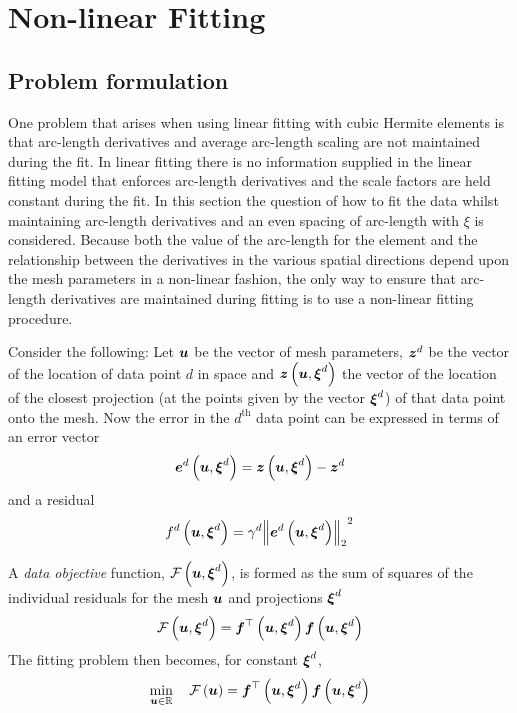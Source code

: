 \section{Non-linear Fitting}
\label{sec:nonlinearfitting} 

\subsection{Problem formulation}
\label{sec:problemformulation}

One problem that arises when using linear fitting with cubic Hermite elements is
that arc-length derivatives and average arc-length scaling are not maintained during
the fit. In linear fitting there is no information supplied in the linear
fitting model that enforces arc-length derivatives and the scale factors are held
constant during the fit. In this section the question of how to fit the data
whilst maintaining arc-length derivatives and an even spacing of arc-length with
$\xi$ is considered.  Because both the value of the arc-length for the element
and the relationship between the derivatives in the various spatial directions
depend upon the mesh parameters in a non-linear fashion, the only way to ensure
that arc-length derivatives are maintained during fitting is to use a non-linear
fitting procedure.

Consider the following: Let $ \boldsymbol{u} $ be the vector of mesh parameters,
$ \boldsymbol{z} ^{d}$ be the vector of the location of data point $d$ in space
and $  \boldsymbol{z} \left(  \boldsymbol{u} , \boldsymbol{\xi} ^{d} \right) $ the vector of the location
of the closest projection (at the points given by the vector
$ \boldsymbol{\xi} ^{d}$) of that data point onto the mesh. Now the error in the
$d^{\text{th}}$ data point can be expressed in terms of an error vector
\begin{equation}
  \fnof{\vectr{e}^{d}}{\vectr{u},\vectr{\xi}^{d}}=\fnof{\vectr{z}}
  {\vectr{u},\vectr{\xi}^{d}}-\vectr{z}^{d}
  \label{eqn:errorvector}
\end{equation}
and a residual
\begin{equation}
  \fnof{f^{d}}{\vectr{u},\vectr{\xi}^{d}}=\gamma^{d}\norm{\fnof{
      \vectr{e}^{d}}{\vectr{u},\vectr{\xi}^{d}}}^{2}
  \label{eqn:dataresidual}
\end{equation}

A \emph{data objective} function,
$ \mathcal{F}\left(  \boldsymbol{u} , \boldsymbol{\xi} ^{d} \right) $, is formed as the sum of
squares of the individual residuals for the mesh $ \boldsymbol{u} $ and projections
$ \boldsymbol{\xi} ^{d}$
\begin{equation}
  \fnof{\mathcal{F}}{\vectr{u},\vectr{\xi}^{d}}=\fntof{\vectr{f}}{\vectr{u},
    \vectr{\xi}^{d}}\fnof{\vectr{f}}{\vectr{u},\vectr{\xi}^{d}}
  \label{eqn:nldataresidualfn}
\end{equation}
The fitting problem then becomes, for constant $ \boldsymbol{\xi} ^{d}$,
\begin{equation}
  \min_{ \boldsymbol{u}  \in \mathbb{R}} \quad  \mathcal{F}\left(  \boldsymbol{u}  \right) =  { \boldsymbol{f} }^{ \top } \left(  \boldsymbol{u} , \boldsymbol{\xi} ^{d} \right)   \boldsymbol{f} \left(  \boldsymbol{u} , \boldsymbol{\xi} ^{d} \right) 
\end{equation}

